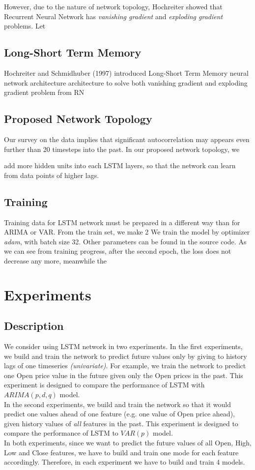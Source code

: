\documentclass[11pt]{article}
\begin{document}
However, due to the nature of network topology, Hochreiter \cite{Hochreiter:91}
showed that Recurrent Neural Network has \textit{vanishing gradient} and
\textit{exploding gradient} problems. Let 

\subsection{Long-Short Term Memory}
Hochreiter and Schmidhuber (1997) \cite{gers1999learning} introduced Long-Short
Term Memory neural network architecture architecture to solve both vanishing
gradient and exploding gradient problem from RN

\subsection{Proposed Network Topology}
Our survey on the data implies that significant autocorrelation may appears even
further than 20 timesteps into the past. In our proposed network topology, we

add more hidden units into each LSTM layers, so that the network can learn from
data points of higher lags.

\subsection{Training}
Training data for LSTM network must be prepared in a different way than for
ARIMA or VAR. From the train set, we make 2
We train the model by optimizer \textit{adam}, with batch size 32. Other
parameters can be found in the source code. As we can see from training progress, after the second epoch, the loss does not
decrease any more, meanwhile the 


\section{Experiments}
\subsection{Description}
We consider using LSTM network in two experiments. In the first experiments, we
build and train the network to predict future values only by giving to history
lags of one timeseries \textit{(univariate)}. For example, we train the network to
predict one Open price value in the future given only the Open prices in the
past. This experiment is designed to compare the performance of LSTM with
$ARIMA(p, d, q)$ model.\\ 
In the second experiments, we build and train the network so that it would
predict one values ahead of one feature (e.g. one value of Open price ahead),
given history values of \textit{all} features in the past. This experiment is
designed to compare the performance of LSTM to $VAR(p)$ model.\\
In both experiments, since we want to predict the future values of all Open,
High, Low and Close features, we have to build and train one mode for each
feature accordingly. Therefore, in each experiment we have to build and train 4
models.
\end{document}
